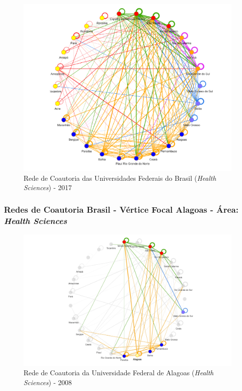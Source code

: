 \begin{figure}[H]
	\centering
	\includegraphics[scale=0.6]{Imagens/rede-2017.pdf}
	\caption{Rede de Coautoria das Universidades Federais do Brasil (\textit{Health Sciences}) - 2017}
	\label{Rede de Coautoria - UF BR 2017}
\end{figure}

\subsubsection{Redes de Coautoria Brasil - Vértice Focal Alagoas - Área: \textit{Health Sciences}}

\begin{figure}[H]
	\centering
	\includegraphics[scale=0.6]{Imagens/rede-al-2008.pdf}
	\caption{Rede de Coautoria da Universidade Federal de Alagoas (\textit{Health Sciences}) - 2008}
	\label{Rede de Coautoria - UF AL 2008}
\end{figure}


